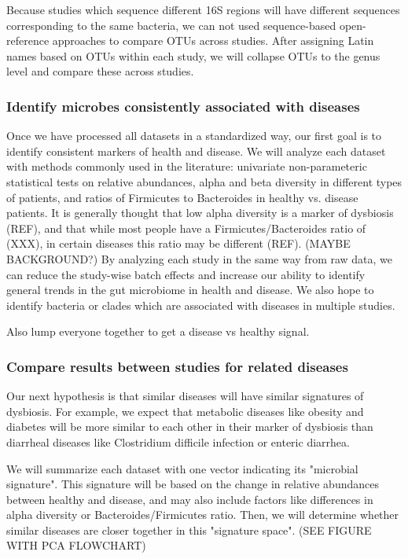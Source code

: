 \documentclass[12pt]{article}
\begin{document}
Because studies which sequence different 16S regions will have different sequences corresponding to the same bacteria, we can not used sequence-based open-reference approaches to compare OTUs across studies. After assigning Latin names based on OTUs within each study, we will collapse OTUs to the genus level and compare these across studies.

\subsubsection{Identify microbes consistently associated with diseases}
Once we have processed all datasets in a standardized way, our first goal is to identify consistent markers of health and disease. We will analyze each dataset with methods commonly used in the literature: univariate non-parameteric statistical tests on relative abundances, alpha and beta diversity in different types of patients, and ratios of Firmicutes to Bacteroides in healthy vs. disease patients. It is generally thought that low alpha diversity is a marker of dysbiosis (REF), and that while most people have a Firmicutes/Bacteroides ratio of (XXX), in certain diseases this ratio may be different (REF). (MAYBE BACKGROUND?) By analyzing each study in the same way from raw data, we can reduce the study-wise batch effects and increase our ability to identify general trends in the gut microbiome in health and disease. We also hope to identify bacteria or clades which are associated with diseases in multiple studies. 

Also lump everyone together to get a disease vs healthy signal.

\subsubsection{Compare results between studies for related diseases}
Our next hypothesis is that similar diseases will have similar signatures of dysbiosis. For example, we expect that metabolic diseases like obesity and diabetes will be more similar to each other in their marker of dysbiosis than diarrheal diseases like Clostridium difficile infection or enteric diarrhea. 

We will summarize each dataset with one vector indicating its "microbial signature". This signature will be based on the change in relative abundances between healthy and disease, and may also include factors like differences in alpha diversity or Bacteroides/Firmicutes ratio. Then, we will determine whether similar diseases are closer together in this "signature space". (SEE FIGURE WITH PCA FLOWCHART) 
\end{document}
